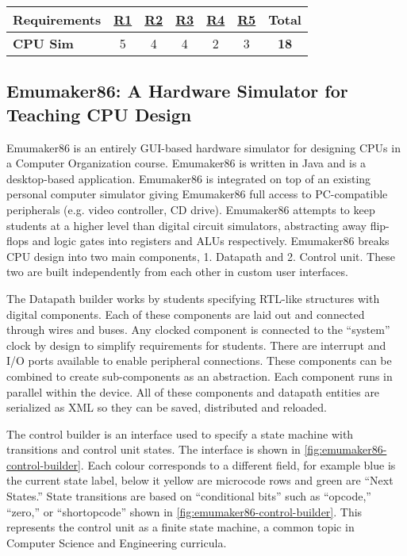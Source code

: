 \begin{table}[h!]
    \centering
    \begin{tabular}{lcccccc}
        \textbf{Requirements} & \textbf{\hyperref[req:personal]{R1}} & \textbf{\hyperref[req:configuration]{R2}} & \textbf{\hyperref[req:pedagogical]{R3}} & \textbf{\hyperref[req:simulations]{R4}} & \textbf{\hyperref[req:modern]{R5}} & \textbf{Total} \\ \hline
        \textbf{CPU Sim}         & 5                                  & 4                                    & 4                            & 2                                  & 3                             & \textbf{18}    \\
    \end{tabular}
\end{table}

\subsection{Emumaker86: A Hardware Simulator for Teaching CPU Design}
\label{sec:review-emumaker86}

Emumaker86 is an entirely GUI-based hardware simulator for designing CPUs in a Computer Organization course\cite{Black2013}. Emumaker86 is written in Java and is a desktop-based application. Emumaker86 is integrated on top of an existing personal computer simulator giving Emumaker86 full access to PC-compatible peripherals (e.g. video controller, CD drive). Emumaker86 attempts to keep students at a higher level than digital circuit simulators, abstracting away flip-flops and logic gates into registers and ALUs respectively. Emumaker86 breaks CPU design into two main components, 1. Datapath and 2. Control unit. These two are built independently from each other in custom user interfaces. 

The Datapath builder works by students specifying RTL-like structures with digital components. Each of these components are laid out and connected through wires and buses. Any clocked component is connected to the ``system'' clock by design to simplify requirements for students. There are interrupt and I/O ports available to enable peripheral connections. These components can be combined to create sub-components as an abstraction. Each component runs in parallel within the device. All of these components and datapath entities are serialized as XML so they can be saved, distributed and reloaded. 

The control builder is an interface used to specify a state machine with transitions and control unit states. The interface is shown in \cref{fig:emumaker86-control-builder}. Each colour corresponds to a different field, for example blue is the current state label, below it yellow are microcode rows and green are ``Next States.'' State transitions are based on ``conditional bits'' such as ``opcode,'' ``zero,'' or ``shortopcode'' shown in \cref{fig:emumaker86-control-builder}. This represents the control unit as a finite state machine, a common topic in Computer Science and Engineering curricula\cite{cec2016}. 

